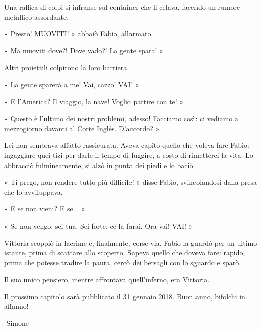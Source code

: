 Una raffica di colpi si infranse sul container che li celava, facendo un rumore metallico assordante.

« Presto! MUOVITI! » abbaiò Fabio, allarmato.

« Ma muoviti dove?! Dove vado?! La gente spara! »

Altri proiettili colpirono la loro barriera.

« La gente sparerà a me! Vai, cazzo! VAI! »

« E l'America? Il viaggio, la nave! Voglio partire con te! »

« Questo è l'ultimo dei nostri problemi, adesso! Facciamo così: ci vediamo a mezzogiorno davanti al Corte Inglés. D'accordo? »

Lei non sembrava affatto rassicurata. Aveva capito quello che voleva fare Fabio: ingaggiare quei tizi per darle il tempo di fuggire, a costo di rimetterci la vita. Lo abbracciò fulmineamente, si alzò in punta dei piedi e lo baciò.

« Ti prego, non rendere tutto più difficile! » disse Fabio, svincolandosi dalla presa che lo avviluppava.

« E se non vieni? E se... »

« Se non vengo, sei tua. Sei forte, ce la farai. Ora vai! VAI! »

Vittoria scoppiò in lacrime e, finalmente, corse via. Fabio la guardò per un ultimo istante, prima di scattare allo scoperto. Sapeva quello che doveva fare: rapido, prima che potesse tradire la paura, cercò dei bersagli con lo sguardo e sparò.

Il suo unico pensiero, mentre affrontava quell'inferno, era Vittoria.

Il prossimo capitolo sarà pubblicato il 31 gennaio 2018. Buon anno, bifolchi in affanno!

-Simone



